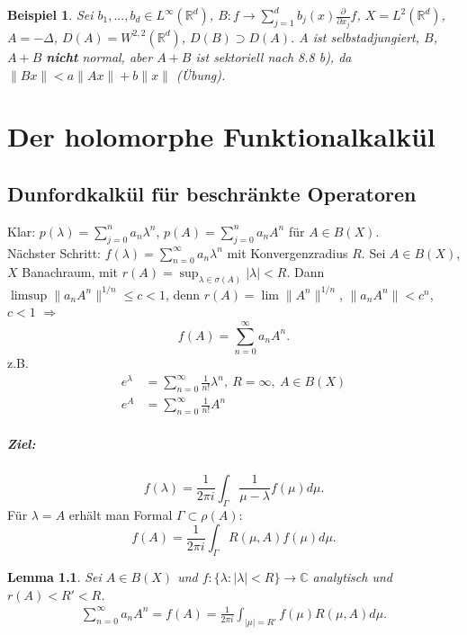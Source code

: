 \documentclass[12pt]{extreport} %
\newtheorem{Lemma}[Satz]{Lemma}
\newtheorem{Beispiel}[Satz]{Beispiel}
\numberwithin{equation}{section}
\newcommand{\C}{\mathbb{C}} %
\newcommand{\R}{\mathbb{R}} %
\newcommand{\laplace}{\Delta}
\begin{document}
	
	\begin{Beispiel}
		Sei $b_1,...,b_d\in L^\infty(\R^d)$, $B\colon f\rightarrow \sum_{j = 1}^{d} b_j(x)\frac{\partial}{\partial x_j} f$, $X = L^2(\R^d)$, $A = -\laplace$, $D(A) = W^{2,2}(\R^d)$, $D(B) \supset D(A)$. A ist selbstadjungiert, $B$, $A+B$ \textbf{nicht} normal, aber $A+B$ ist sektoriell nach 8.8 b), da $\|Bx\|< a\| Ax\| + b\|x\|$ (Übung).
	\end{Beispiel}
	
	\newpage
	
	\chapter{Der holomorphe Funktionalkalkül}
	
	\section{Dunfordkalkül für beschränkte Operatoren}
	
	Klar: $p(\lambda) = \sum_{j = 0}^{n}a_n \lambda^n$, $p(A) = \sum_{j = 0}^{n} a_n A^n$ für $A\in B(X)$. \\
	Nächster Schritt: $f(\lambda) = \sum_{n = 0}^{\infty} a_n \lambda^n$ mit Konvergenzradius $R$. Sei $A\in B(X)$, $X$ Banachraum, mit $r(A) = \sup_{\lambda\in \sigma(A)}|\lambda|< R$. Dann $\limsup \|a_n A^n\|^{1/n}\leq c< 1$, denn $r(A) = \lim\|A^n\|^{1/n}$, $\|a_n A^n\|<c^n$, $c<1$ $\Rightarrow$ 
	$$\boxed{f(A) = \sum_{n = 0}^{\infty}a_nA^n.}$$
	z.B.
	\begin{align*}
		e^\lambda &= \sum_{n = 0}^{\infty} \frac{1}{n!}\lambda^n,~ R = \infty,~ A\in B(X)\\
		e^A &= \sum_{n = 0}^{\infty} \frac{1}{n!} A^n
	\end{align*}
	
	\paragraph{Ziel:} 
	$$f(\lambda) = \frac{1}{2\pi i}\int_\Gamma \frac{1}{\mu-\lambda} f(\mu) d\mu.$$
	Für $\lambda= A$ erhält man Formal $\Gamma\subset \rho(A)$:
	$$f(A) = \frac{1}{2\pi i}\int_{\Gamma} R(\mu,A) f(\mu)d\mu.$$
	
	\begin{Lemma}
		Sei $A\in B(X)$ und $f\colon \{\lambda\colon |\lambda|<R \}\rightarrow \C$ analytisch und $r(A)<R'<R$.
		\begin{align*}
			\sum_{n = 0}^{\infty} a_n A^n = f(A) = \frac{1}{2\pi i}\int_{|\mu|= R'} f(\mu) R(\mu,A) d\mu.
		\end{align*}
	\end{Lemma}
	
\end{document}
